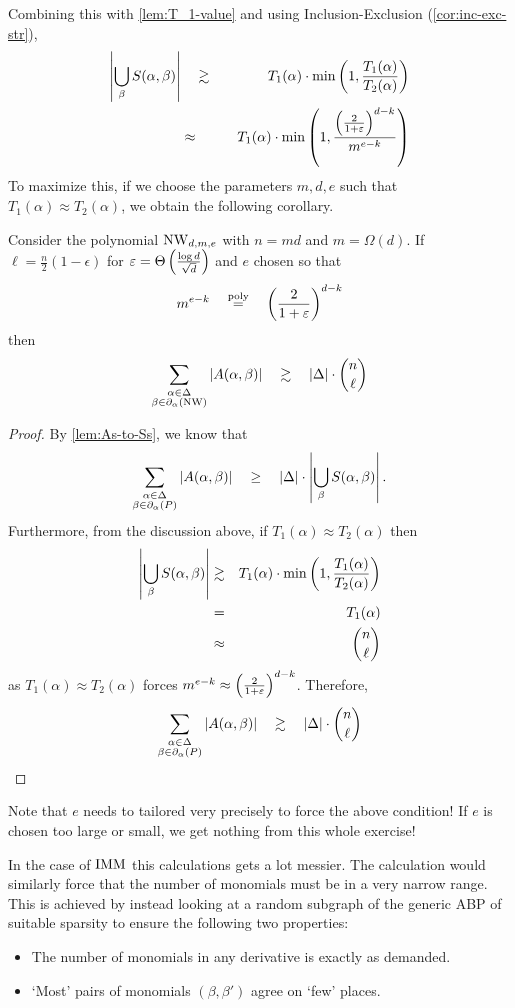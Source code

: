 \noindent
Combining this with \autoref{lem:T_1-value} and using Inclusion-Exclusion (\autoref{cor:inc-exc-str}),
\begin{eqnarray*}
\left|\bigcup_{\beta} S(\alpha,\beta)\right| &\quad \gtrsim \quad& T_1(\alpha) \cdot \min\left(1,\frac{T_1(\alpha)}{T_2(\alpha)}\right)\\
& \approx & T_1(\alpha) \cdot \min\left(1,\frac{\left(\frac{2}{1+\varepsilon}\right)^{d-k}}{m^{e-k}}\right)
\end{eqnarray*}
To maximize this, if we choose the parameters $m,d,e$ such that $T_1(\alpha) \approx T_2(\alpha)$, we obtain the following corollary. 
\begin{corollary}\label{cor:T2-bound}
Consider the polynomial $\operatorname{\mathrm{NW}}_{d,m,e}$ with $n = md$ and $m = \Omega(d)$. 
If $\ell = \frac{n}{2}(1 - \epsilon)$ for $\varepsilon = \Theta\left(\frac{\log d}{\sqrt{d}}\right)$ and $e$ chosen so that
\[
m^{e-k} \quad \stackrel{\operatorname{poly}}{=} \quad \left(\frac{2}{1+\varepsilon}\right)^{d-k}
\]
then
\[
\sum_{\substack{\alpha \in \Delta\\\beta \in \partial_\alpha(\mathrm{NW})}}\left|A(\alpha, \beta)\right| \quad \gtrsim \quad \left|\Delta\right|\cdot  \binom{n}{\ell}
\]
\end{corollary}
\begin{proof}
By \autoref{lem:As-to-Ss}, we know that
\[
\sum_{\substack{\alpha\in \Delta\\\beta \in \partial_\alpha(P)}} \left|A(\alpha,\beta)\right| \quad \geq \quad \left|\Delta\right| \cdot \left|\bigcup_{\beta} S(\alpha,\beta)\right|.
\]
Furthermore, from the discussion above, if $T_1(\alpha) \approx T_2(\alpha)$ then
\begin{eqnarray*}
\left|\bigcup_{\beta}S(\alpha, \beta)\right| &\gtrsim &  T_1(\alpha) \cdot \min\left(1,\frac{T_1(\alpha)}{T_2(\alpha)}\right)\\
 & = & T_1(\alpha)\\
 & \approx & \binom{n}{\ell}
\end{eqnarray*}
as $T_1(\alpha) \approx T_2(\alpha)$ forces $m^{e-k} \approx \left(\frac{2}{1+\varepsilon}\right)^{d-k}$. Therefore,
\[
\sum_{\substack{\alpha\in \Delta\\\beta \in \partial_\alpha(P)}} \left|A(\alpha,\beta)\right| \quad \gtrsim \quad \left|\Delta\right| \cdot \binom{n}{\ell}\qedhere
\]
\end{proof}

Note that $e$ needs to tailored very precisely to force the above condition! 
If $e$ is chosen too large or small, we get nothing from this whole exercise!

In the case of $\operatorname{\mathrm{IMM}}$ this calculations gets a lot messier. 
The calculation would similarly force that the number of monomials must be in a very narrow range. 
This is achieved by instead looking at a random subgraph of the generic ABP of suitable sparsity to ensure the following two properties:
\begin{itemize}
  \item The number of monomials in any derivative is exactly as demanded. 
  \item `Most' pairs of monomials $(\beta, \beta')$ agree on `few' places. 
\end{itemize}

